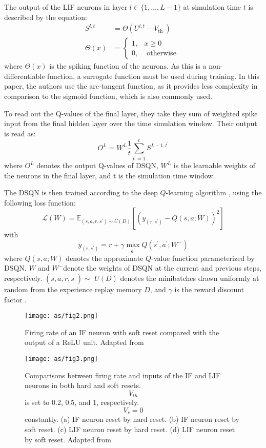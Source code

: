 \documentclass[journal,onecolumn]{IEEEtran}
\begin{document}
The output of the LIF neurons in layer \(l \in\{1, \ldots, L-1\}\) at
simulation time \(t\) is described by the equation: \[
\begin{aligned}
S^{l, t} & =\Theta\left(U^{l, t}-V_{\text {th }}\right) \\
\Theta(x) & = \begin{cases}1, & x \geq 0 \\
0, & \text { otherwise }\end{cases}
\end{aligned}
\] where \(\Theta(x)\) is the spiking function of the neurons. As this
is a non-differentiable function, a surrogate function must be used
during training. In this paper, the authors use the arc-tangent function, as it
provides less complexity in comparison to the sigmoid function, which is
also commonly used.

To read out the Q-values of the final layer, they take they sum of
weighted spike input from the final hidden layer over the time
simulation window. Their output is read as:
\[O^L=W^L \frac{1}{t} \sum_{t^{\prime}=1}^t S^{L-1, t^{\prime}}\]where
\(O^L\) denotes the output Q-values of DSQN, \(W^L\) is the learnable
weights of the neurons in the final layer, and t is the simulation time
window.

The DSQN is then trained according to the deep \(Q\)-learning algorithm
\autocite{mnihHumanlevelControlDeep2015}, using the following
loss function: \[
 \mathcal{L}(W)=\mathbb{E}_{\left(s, a, r, s^{\prime}\right) \sim U(D)}\left[\left(y_{\left(r, s^{\prime}\right)}-Q(s, a ; W)\right)^2\right]
 \] with \[
 y_{\left(r, s^{\prime}\right)}=r+\gamma \max _{a^{\prime}} Q\left(s^{\prime}, a^{\prime} ; W^{-}\right)
 \] where \(Q(s, a ; W)\) denotes the approximate \(Q\)-value function
parameterized by DSQN. \(W\) and \(W^{-}\)denote the weights of DSQN at
the current and previous steps, respectively.
\(\left(s, a, r, s^{\prime}\right) \sim\) \(U(D)\) denotes the
minibatches drawn uniformly at random from the experience replay memory
\(D\), and \(\gamma\) is the reward discount factor
\autocite{liuHumanLevelControlDirectly2022}.


\begin{figure}
\centering
\texttt{[image: as/fig2.png]}
\caption{Firing rate of an IF neuron with soft reset compared with the output of a ReLU unit. Adapted from \autocite{liuHumanLevelControlDirectly2022}
}
\label{fig_2}
\end{figure}

\begin{figure}
\centering
\texttt{[image: as/fig3.png]}
\caption{Comparisons between firing rate and inputs of the IF and LIF neurons in both hard and soft resets. \[V_{th}\] is set to 0.2, 0.5, and 1, respectively. \[V_{r} = 0\] constantly. (a) IF neuron reset by hard reset. (b) IF neuron reset by soft reset. (c) LIF neuron reset by hard reset. (d) LIF neuron reset by soft reset.  Adapted from \autocite{liuHumanLevelControlDirectly2022}
}
\label{fig_3}
\end{figure}
\end{document}
